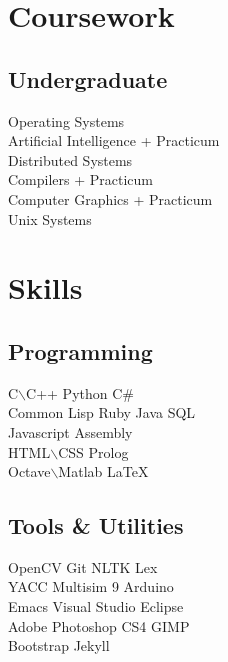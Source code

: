 \documentclass[]{single-page-resume}
\begin{document}
\begin{minipage}[t]{0.33\textwidth}

\section{Coursework}

\subsection{Undergraduate}
Operating Systems \\
Artificial Intelligence + Practicum \\
Distributed Systems \\
Compilers + Practicum \\
Computer Graphics + Practicum \\
Unix Systems \\
\sectionsep


\section{Skills}
\subsection{Programming}
C$\backslash$C++ \textbullet{}   Python \textbullet{} C\# \\
Common Lisp \textbullet{} Ruby \textbullet{} Java \textbullet{} SQL \\ 
\textbullet{} Javascript \textbullet{} Assembly \\
HTML$\backslash$CSS \textbullet{} Prolog \textbullet{} \\
Octave$\backslash$Matlab \textbullet{} \LaTeX\ \\
\subsection{Tools \& Utilities}
OpenCV \textbullet{} Git \textbullet{} NLTK \textbullet{} Lex \\
\textbullet{} YACC \textbullet{} Multisim 9 \textbullet{} Arduino \\ \textbullet{}Emacs \textbullet{} Visual Studio \textbullet{} Eclipse \\ \textbullet{} Adobe Photoshop CS4 \textbullet{} GIMP \\ \textbullet{} Bootstrap \textbullet{} Jekyll \\

\sectionsep

%
%

\end{minipage} 
\end{document}
